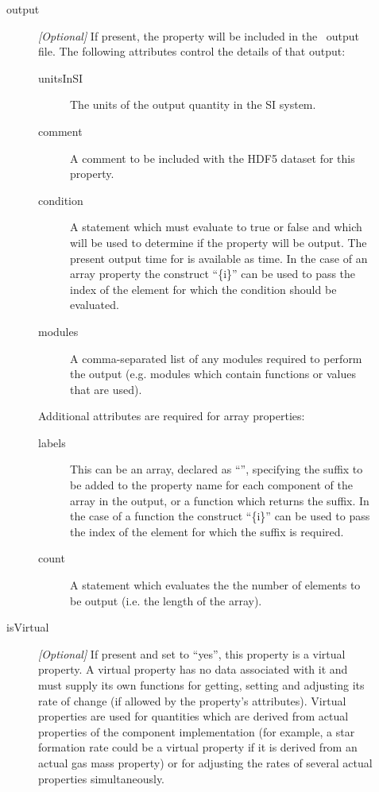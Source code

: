 \begin{description}
\begin{description}
\begin{description}
\end{description}
\item [{\normalfont \ttfamily output}] \emph{[Optional]} If present, the property will be included in the \glc\ output file. The following attributes control the details of that output:
\begin{description}
\item [{\normalfont \ttfamily unitsInSI}] The units of the output quantity in the SI system.
\item [{\normalfont \ttfamily comment}] A comment to be included with the HDF5 dataset for this property.
\item [{\normalfont \ttfamily condition}] A statement which must evaluate to {\normalfont \ttfamily true} or {\normalfont \ttfamily false} and which will be used to determine if the property will be output. The present output time for is available as {\normalfont \ttfamily time}. In the case of an array property the construct ``{\normalfont \ttfamily \{i\}}'' can be used to pass the index of the element for which the condition should be evaluated.
\item [{\normalfont \ttfamily modules}] A comma-separated list of any modules required to perform the output (e.g. modules which contain functions or values that are used).
\end{description}
Additional attributes are required for array properties:
\begin{description}
\item [{\normalfont \ttfamily labels}] This can be an array, declared as ``{\normalfont \ttfamily [$L_1$,\ldots,$L_N$]}'', specifying the suffix to be added to the property name for each component of the array in the output, or a function which returns the suffix. In the case of a function the construct ``{\normalfont \ttfamily \{i\}}'' can be used to pass the index of the element for which the suffix is required.
\item [{\normalfont \ttfamily count}] A statement which evaluates the the number of elements to be output (i.e. the length of the array).
\end{description}
\item [{\normalfont \ttfamily isVirtual}] \emph{[Optional]} If present and set to ``{\normalfont \ttfamily yes}'', this property is a virtual property. A virtual property has no data associated with it and must supply its own functions for getting, setting and adjusting its rate of change (if allowed by the property's attributes). Virtual properties are used for quantities which are derived from actual properties of the component implementation (for example, a star formation rate could be a virtual property if it is derived from an actual gas mass property) or for adjusting the rates of several actual properties simultaneously.

\end{description}
\end{description}
